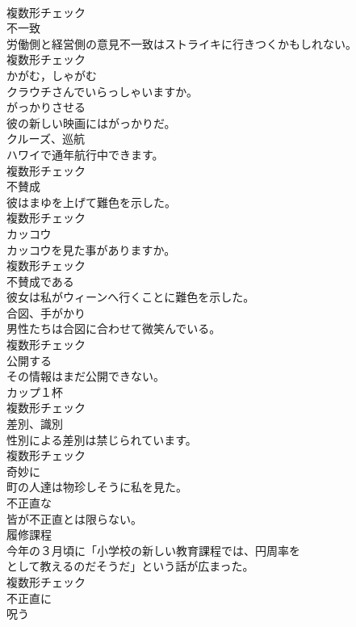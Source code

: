 \documentclass[8pt]{extreport}
\begin{document}
\begin{CJK}{UTF8}{min}
\\	複数形チェック
\\	[名詞]	不一致	
\\	労働側と経営側の意見不一致はストライキに行きつくかもしれない。	
\\	複数形チェック
\\	[動詞]	かがむ，しゃがむ	
\\	クラウチさんでいらっしゃいますか。	
\\	[形容詞]	がっかりさせる	
\\	彼の新しい映画にはがっかりだ。	
\\	[名詞]	クルーズ、巡航	
\\	ハワイで通年航行中できます。	
\\	複数形チェック
\\	[名詞]	不賛成	
\\	彼はまゆを上げて難色を示した。	
\\	複数形チェック
\\	[名詞]	カッコウ	
\\	カッコウを見た事がありますか。	
\\	複数形チェック
\\	[動詞]	不賛成である	
\\	彼女は私がウィーンへ行くことに難色を示した。	
\\	[名詞]	合図、手がかり	
\\	男性たちは合図に合わせて微笑んでいる。	
\\	複数形チェック
\\	[動詞]	公開する	
\\	その情報はまだ公開できない。	
\\	[名詞]	カップ１杯	
\\	複数形チェック
\\	[名詞]	差別、識別	
\\	性別による差別は禁じられています。	
\\	複数形チェック
\\	[副詞]	奇妙に	
\\	町の人達は物珍しそうに私を見た。	
\\	[形容詞]	不正直な	
\\	皆が不正直とは限らない。	
\\	[名詞]	履修課程	
\\	今年の３月頃に「小学校の新しい教育課程では、円周率を
\\	として教えるのだそうだ」という話が広まった。	
\\	複数形チェック
\\	[副詞]	不正直に	
\\	[動詞]	呪う	

\end{CJK}
\end{document}
